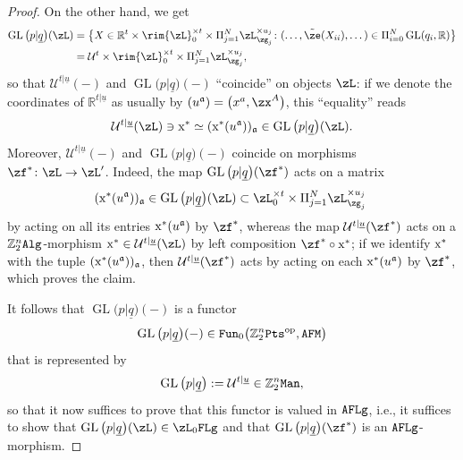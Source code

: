 \documentclass[10pt,a4paper]{amsart}
\newcommand{\op}[1]{\operatorname{#1}}
\newcommand{\R}{{\mathbb R}}
\newcommand{\Z}{{\mathbb Z}}
\def\ul{\underline}
\def\cU{\mathcal{U}}
\def\ul{\underline}
\newcommand{\0}{\otimes}
\newcommand{\z}{\Z_2^n}
\numberwithin{equation}{section}
\begin{document}
\begin{proof}
On the other hand, we get
\begin{align*}
\op{GL}\big(p|\ul q\big)(\zL)&=\big\{X\in\R^t\times \rim{\zL}^{\times t}_0\times\Pi_{j=1}^N\zL_{\zg_j}^{\times u_j}\colon (
\dots,\tilde{\ze}(X_{ii}),\dots)\in\Pi_{i=0}^N\op{GL}(q_i,\R)\big\}
\\
&=\cU^t\times\rim{\zL}^{\times t}_0\times\Pi_{j=1}^N\zL_{\zg_j}^{\times u_j},
\end{align*}
so that $\cU^{t|\ul u}(-)$ and $\op{GL}\big(p|\ul q\big)(-)$ ``coincide'' on objects $\zL$: if we denote the coordinates of $\R^{t|\ul u}$ as usually by $(u^{\mathfrak{a}})=\big(x^a,\zx^A\big)$, this ``equality'' reads
\[
\cU^{t|\ul u}(\zL)\ni{\rm x}^*\simeq ({\rm x}^*(u^{\mathfrak{a}}))_{\mathfrak{a}}\in \op{GL}\big(p|\ul q\big)(\zL).
\]
Moreover, $\cU^{t|\ul u}(-)$ and $\op{GL}\big(p|\ul q\big)(-)$ coincide on morphisms $\zf^*\colon \zL\to\zL'$. Indeed, the map $\op{GL}\big(p|\ul q\big)(\zf^*)$ acts on a matrix
\[
({\rm x}^*(u^{\mathfrak{a}}))_{\mathfrak{a}}\in\op{GL}\big(p|\ul q\big)(\zL)\subset\zL^{\times t}_0\times\Pi_{j=1}^N\zL_{\zg_j}^{\times u_j}\;
\]
by acting on all its entries ${\rm x}^*(u^{\mathfrak{a}})$ by $\zf^*$, whereas the map $\cU^{t|\ul u}(\zf^*)$ acts on a $\z{\tt Alg}$-morphism ${\rm x}^*\in\cU^{t|\ul u}(\zL)$ by left composition $\zf^*\circ{\rm x}^*$; if we identify ${\rm x}^*$ with the tuple $({\rm x}^*(u^{\mathfrak{a}}))_{\mathfrak{a}}$, then $\cU^{t|\ul u}(\zf^*)$ acts by acting on each ${\rm x}^*(u^{\mathfrak{a}})$ by $\zf^*$, which proves the claim.

It follows that $\op{GL}\big(p|\ul q\big)(-)$ is a functor
\[
\op{GL}\big(p|\ul q\big)(-)\in{\tt Fun}_0\big(\z{\tt Pts}^{\op{op}},{\tt AFM}\big)
\]
that is represented by
\begin{gather}\label{GL3}
\op{GL}\big(p|\ul q\big):=\cU^{t|\ul u}\in\z{\tt Man},
\end{gather}
so that it now suffices to prove that this functor is valued in ${\tt AFLg}$, i.e., it suffices to show that $\op{GL}\big(p|\ul q\big)(\zL)\in\zL_0{\tt FLg}$ and that $\op{GL}\big(p|\ul q\big)(\zf^*)$ is an ${\tt AFLg}$-morphism.


\end{proof}
\end{document}
